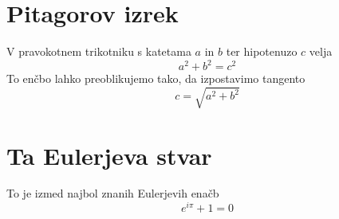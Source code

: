 \documentclass{article}
\begin{document}
\section*{Pitagorov izrek}
V pravokotnem trikotniku s katetama \(a\) in \(b\) ter hipotenuzo \(c\) velja
\[ a^2 + b^2 = c^2 \]
To enčbo lahko preoblikujemo tako, da izpostavimo tangento
\[ c = \sqrt{a^2 + b^2} \]

\section*{Ta Eulerjeva stvar}
To je izmed najbol znanih Eulerjevih enačb
\[ e^{i \pi} + 1 = 0 \]
\end{document}
